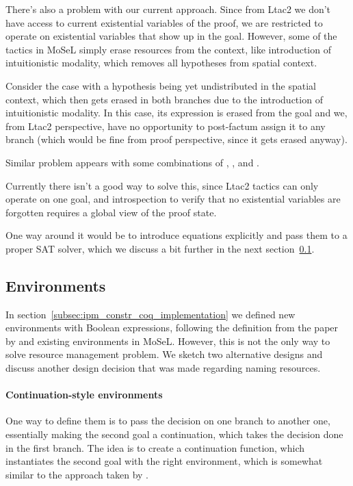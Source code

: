 There's also a problem with our current approach.
Since from Ltac2 we don't have access to current existential variables of the proof, we are restricted to operate on existential variables that show up in the goal.
However, some of the tactics in MoSeL simply erase resources from the context, like introduction of intuitionistic modality, which removes all hypotheses from spatial context.

Consider the case with a hypothesis being yet undistributed in the spatial context, which then gets erased in both branches due to the introduction of intuitionistic modality.
In this case, its expression is erased from the goal and we, from Ltac2 perspective, have no opportunity to post-factum assign it to any branch (which would be fine from proof perspective, since it gets erased anyway).

Similar problem appears with some combinations of , , and .

Currently there isn't a good way to solve this, since Ltac2 tactics can only operate on one goal, and introspection to verify that no existential variables are forgotten requires a global view of the proof state.

One way around it would be to introduce equations explicitly and pass them to a proper SAT solver, which we discuss a bit further in the next section~\ref{subsec:environments}.

\subsection{Environments}
\label{subsec:environments}

In section~\ref{subsec:ipm_constr_coq_implementation} we defined new environments with Boolean expressions, following the definition from the paper by \citet{harlandResourceDistributionBooleanConstraints2003} and existing environments in MoSeL.
However, this is not the only way to solve resource management problem.
We sketch two alternative designs and discuss another design decision that was made regarding naming resources.

\paragraph{Continuation-style environments}

One way to define them is to pass the decision on one branch to another one, essentially making the second goal a continuation, which takes the decision done in the first branch.
The idea is to create a continuation function, which instantiates the second goal with the right environment, which is somewhat similar to the approach taken by \citet{LolliLinearLogic}.

